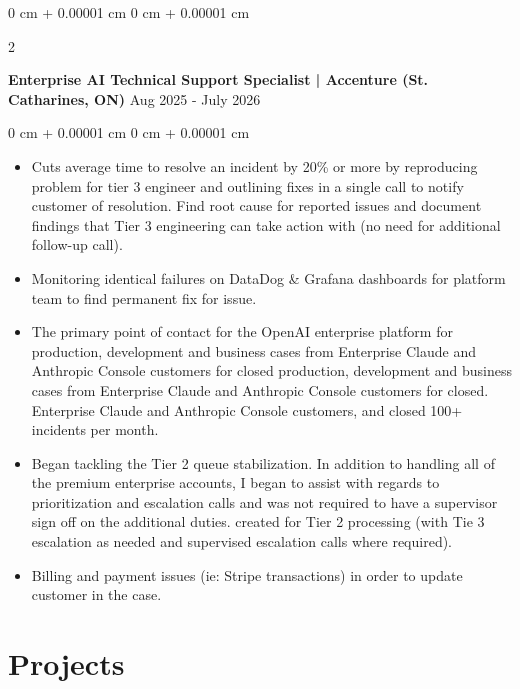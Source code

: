 \documentclass[10pt, letterpaper]{article}
\newenvironment{highlights}{
    \begin{itemize}[
        topsep=0.10 cm,
        parsep=0.10 cm,
        partopsep=0pt,
        itemsep=0pt,
        leftmargin=0 cm + 10pt
    ]
}{
    \end{itemize}
} %
\newenvironment{onecolentry}{
    \begin{adjustwidth}{
        0 cm + 0.00001 cm
    }{
        0 cm + 0.00001 cm
    }
}{
    \end{adjustwidth}
} %
\newenvironment{twocolentry}[2][]{
    \onecolentry
    \def\secondColumn{#2}
    \setcolumnwidth{\fill, 4.5 cm}
    \begin{paracol}{2}
}{
    \switchcolumn \raggedleft \secondColumn
    \end{paracol}
    \endonecolentry
} %
\begin{document}
        \begin{twocolentry}{
            {Aug 2025 - July 2026}
        }
            \textbf{Enterprise AI Technical Support Specialist | Accenture (St. Catharines, ON)}\end{twocolentry}
        \vspace{0.10 cm}
        \begin{onecolentry}
            \begin{highlights}
                \item Cuts average time to resolve an incident by 20\% or more by reproducing problem for tier 3 engineer and outlining fixes in a single call to notify customer of resolution. Find root cause for reported issues and document findings that Tier 3 engineering can take action with (no need for additional follow-up call).
                \item Monitoring identical failures on DataDog \& Grafana dashboards for platform team to find permanent fix for issue.
                \item The primary point of contact for the OpenAI enterprise platform for production, development and business cases from Enterprise Claude and Anthropic Console customers for closed production, development and business cases from Enterprise Claude and Anthropic Console customers for closed. Enterprise Claude and Anthropic Console customers, and closed 100+ incidents per month.
                \item Began tackling the Tier 2 queue stabilization. In addition to handling all of the premium enterprise accounts, I began to assist with regards to prioritization and escalation calls and was not required to have a supervisor sign off on the additional duties. created for Tier 2 processing (with Tie 3 escalation as needed and supervised escalation calls where required).
                \item Billing and payment issues (ie: Stripe transactions) in order to update customer in the case.
            \end{highlights}
        \end{onecolentry}

    \section{Projects}
\end{document}
